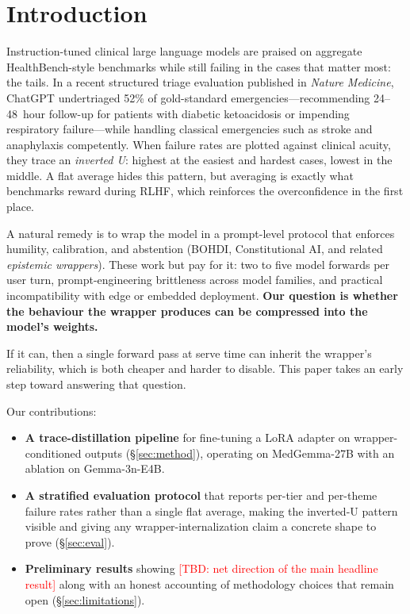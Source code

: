\documentclass[10pt,letterpaper]{article}
\newcommand{\tbd}[1]{\textcolor{red}{[TBD: #1]}}
\begin{document}
\section{Introduction}
\label{sec:intro}

Instruction-tuned clinical large language models are praised on aggregate
HealthBench-style benchmarks while still failing in the cases that matter
most: the tails. In a recent structured triage evaluation published in
\emph{Nature Medicine}, ChatGPT undertriaged
52\% of gold-standard emergencies---recommending 24--48~hour follow-up
for patients with diabetic ketoacidosis or impending respiratory
failure---while handling classical emergencies such as stroke and
anaphylaxis competently. When failure rates are plotted against clinical
acuity, they trace an \emph{inverted U}: highest at the easiest and
hardest cases, lowest in the middle. A flat average hides this pattern,
but averaging is exactly what benchmarks reward during RLHF, which
reinforces the overconfidence in the first place.

A natural remedy is to wrap the model in a prompt-level protocol that
enforces humility, calibration, and abstention
(BOHDI, Constitutional AI, and related
\emph{epistemic wrappers}). These work but pay for it: two to
five model forwards per user turn, prompt-engineering brittleness across
model families, and practical incompatibility with edge or embedded
deployment. \textbf{Our question is whether the behaviour the wrapper
produces can be compressed into the model's weights.}

If it can, then a single forward pass at serve time can inherit the
wrapper's reliability, which is both cheaper and
harder to disable. This paper takes an early step toward answering that
question.

Our contributions:
\begin{itemize}[leftmargin=*,topsep=0pt,itemsep=1pt]
\item \textbf{A trace-distillation pipeline} for fine-tuning a
      LoRA adapter on wrapper-conditioned outputs
      (\S\ref{sec:method}), operating on MedGemma-27B
      with an ablation on Gemma-3n-E4B.
\item \textbf{A stratified evaluation protocol} that reports per-tier
      and per-theme failure rates rather than a single flat average,
      making the inverted-U pattern visible and giving any
      wrapper-internalization claim a concrete shape to prove
      (\S\ref{sec:eval}).
\item \textbf{Preliminary results} showing \tbd{net direction of the
      main headline result} along with an honest accounting of
      methodology choices that remain open
      (\S\ref{sec:limitations}).
\end{itemize}
\end{document}
